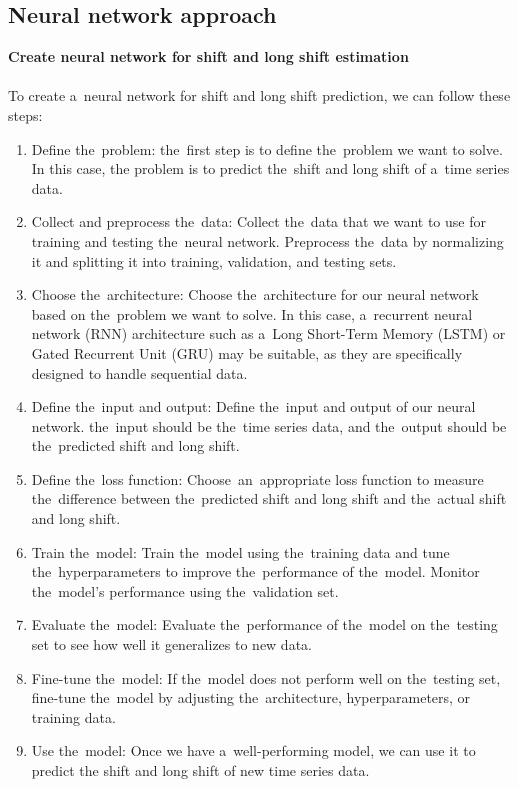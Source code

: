         \subsection{Neural network approach} \label{subsec:neural}
        \textbf{Create neural network for shift and long shift estimation}\\
        \\
        To create a~neural network for shift and long shift prediction, we can follow these steps:
        \begin{enumerate}
            \item Define the~problem: the~first step is to define the~problem we want to solve. In this case, the
            problem is to predict the~shift and long shift of a~time series data.
            \item Collect and preprocess the~data: Collect the~data that we want to use for training and
            testing the~neural network. Preprocess the~data by normalizing it and splitting it into training,
            validation, and testing sets.
            \item Choose the~architecture: Choose the~architecture for our neural network based on the~problem
            we want to solve. In this case, a~recurrent neural network (RNN) architecture such as a~Long Short-Term
            Memory (LSTM) or Gated Recurrent Unit (GRU) may be suitable, as they are specifically designed to handle
            sequential data.
            \item Define the~input and output: Define the~input and output of our neural network. the~input should
            be the~time series data, and the~output should be the~predicted shift and long shift.
            \item Define the~loss function: Choose~an~appropriate loss function to measure the~difference
            between the~predicted shift and long shift and the~actual shift and long shift.
            \item Train the~model: Train the~model using the~training data and tune the~hyperparameters to
            improve the~performance of the~model. Monitor the~model's performance using the~validation set.
            \item Evaluate the~model: Evaluate the~performance of the~model on the~testing set to see how well
            it generalizes to new data.
            \item Fine-tune the~model: If the~model does not perform well on the~testing set, fine-tune the~model by
            adjusting the~architecture, hyperparameters, or training data.
            \item Use the~model: Once we have a~well-performing model, we can use it to predict the
            shift and long shift of new time series data.
        \end{enumerate}
